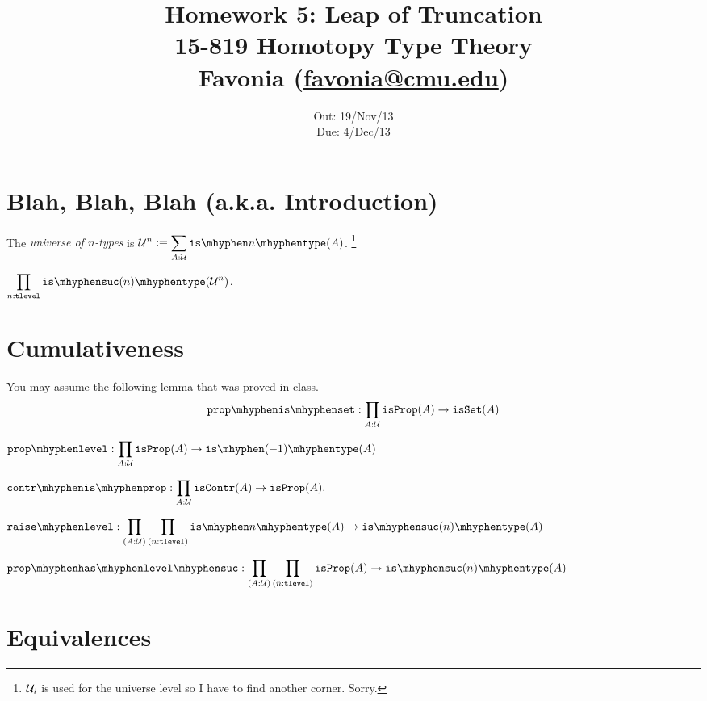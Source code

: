 \documentclass[12pt]{article}
\title{\Large\textbf{
  Homework 5: Leap of Truncation}
\normalsize\\
15-819 Homotopy Type Theory\\
Favonia (\href{mailto:favonia@cmu.edu}{favonia@cmu.edu})}
\author{}
\date{%
Out: 19/Nov/13\\
Due: 4/Dec/13
}
\begin{document}
\maketitle

\section{Blah, Blah, Blah (a.k.a. Introduction)}

\begin{definition}
  The
  \emph{universe of $n$-types}
  is
  $\displaystyle \U^n \defeq \sum_{A:\U} \istype{n}(A)$.%
  \footnote{$\mathcal{U}_i$ is used for the universe level so I have to find another corner. Sorry.}
\end{definition}

\begin{theorem}
  $\displaystyle \prod_{n:\tlevel} \istype{\suc(n)}(\U^n)$.
\end{theorem}

\section{Cumulativeness}

You may assume the following lemma that was proved in class.
\[
  \displaystyle \propisset : \prod_{A:\U} \isprop(A) \to \isset(A)
\]

\begin{task}
  $\displaystyle
    \proplevel : \prod_{A : \U} \isprop(A) \to \istype{(-1)}(A)
  $
\end{task}

\begin{task}
  $\displaystyle
    \contrisprop : \prod_{A : \U} \iscontr(A) \to \isprop(A).
  $
\end{task}

\begin{task}
  $\displaystyle
    \raiselevel :
    \prod_{(A:\U)}
    \prod_{(n:\tlevel)}
    \istype{n}(A) \to \istype{\suc(n)}(A)
  $
\end{task}

\begin{task}
  $\displaystyle
    \prophaslevelsuc :
    \prod_{(A:\U)}
    \prod_{(n:\tlevel)}
    \isprop(A) \to \istype{\suc(n)}(A)
  $
\end{task}

\section{Equivalences}
\end{document}
